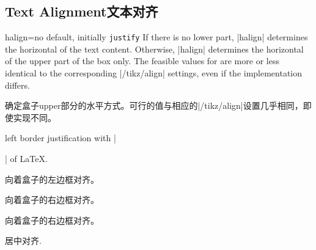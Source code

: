 \setcounter{section}{4}
\setcounter{subsection}{5}
\setcounter{subsubsection}{0}
 
\subsection{Text Alignment文本对齐}
\begin{docTcbKey}[][doc new=2015-05-07]{halign}{=}{no default, initially \texttt{justify}}
If there is no lower part, |halign| determines the horizontal 
of the text content.
Otherwise, |halign| determines the horizontal 
of the upper part of the box only.
The feasible values for  are more or less identical to
the corresponding |/tikz/align| settings, even if the implementation differs.

确定盒子upper部分的水平方式。可行的值与相应的|/tikz/align|设置几乎相同，即使实现不同。





{left border justification with |\raggedright| of \LaTeX.}
{向着盒子的左边框对齐。}%

{向着盒子的右边框对齐。}%

{向着盒子的右边框对齐。}%

{居中对齐.}%


\end{docTcbKey}
